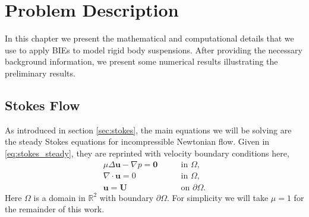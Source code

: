 \chapter{Problem Description}

In this chapter we present the mathematical and computational details that we use to apply BIEs to model rigid body suspensions. After providing the necessary background information, we present some numerical results illustrating the preliminary results.
 
\section{Stokes Flow}

As introduced in section \ref{sec:stokes}, the main equations we will be solving are the steady Stokes equations for incompressible Newtonian flow. Given in \eqref{eq:stokes_steady}, they are reprinted with velocity boundary conditions here,
\begin{subequations}\label{eq:stokes}
\begin{align}
	\mu\Delta\mathbf{u} - \nabla p = \mathbf{0}\label{eq:stokes_mom} &\qquad\text{in }\Omega,\\
	\nabla\cdot\mathbf{u} = 0\label{eq:stokes_div} &\qquad\text{in }\Omega,\\
	\mathbf{u} = \mathbf{U} &\qquad\text{on } \partial\Omega.\label{eq:u_bc}
\end{align}
\end{subequations}
 Here $\Omega$ is a domain in $\mathbb{R}^2$ with boundary $\partial\Omega$. For simplicity we will take $\mu=1$ for the remainder of this work.

